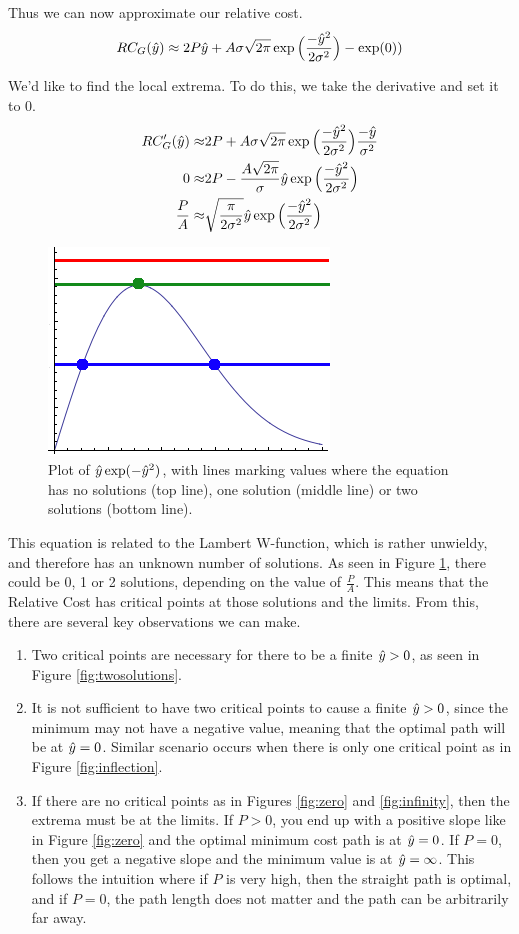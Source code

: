 Thus we can now approximate our relative cost. 
\[
RC_G(\hat{y}) \approx 2P\hat{y} + A\sigma\sqrt{2\pi} \exp\Big(\frac{-\hat{y}^2}{2\sigma^2}\Big) - \exp(0) ) \\
\]

We'd like to find the local extrema. To do this, we take the derivative and set it to 0. 
\begin{align}
RC'_G(\hat{y}) \approx& 2P + A\sigma\sqrt{2\pi}             \exp\Big( \frac{-\hat{y}^2}{2\sigma^2} \Big) \frac{-\hat{y}}{\sigma^2}\notag\\
0  \approx& 2P - \frac{A\sqrt{2\pi}}{\sigma}        \hat{y} \exp\Big( \frac{-\hat{y}^2}{2\sigma^2} \Big) \notag\\
  \frac{P}{A} \approx& \sqrt{\frac{\pi}{2\sigma^2}} \hat{y} \exp\Big( \frac{-\hat{y}^2}{2\sigma^2} \Big) 
\end{align}
\begin{figure}
\centering
\includegraphics[width=0.4\columnwidth]{graphix/lambert.png}
\caption{Plot of $\hat{y} \exp(-\hat{y}^2)$, with lines marking values where the equation has no solutions (top line), one solution (middle line) or two solutions (bottom line).}
\label{fig:lambert}
\end{figure}

This equation is related to the Lambert W-function, which is rather unwieldy, and therefore has an unknown number of solutions. As seen in Figure \ref{fig:lambert}, there could be 0, 1 or 2 solutions, depending on the value of $\frac{P}{A}$. This means that the Relative Cost has critical points at those solutions and the limits. From this, there are several key observations we can make. 
\begin{enumerate}
\item Two critical points are necessary for there to be a finite $\hat{y}>0$, as seen in Figure \ref{fig:twosolutions}. 
\item It is not sufficient to have two critical points to cause a finite $\hat{y}>0$, since the minimum may not have a negative value, meaning that the optimal path will be at $\hat{y}=0$. Similar scenario occurs when there is only one critical point as in Figure \ref{fig:inflection}. 
\item If there are no critical points as in Figures \ref{fig:zero} and \ref{fig:infinity}, then the extrema must be at the limits. If $P>0$, you end up with a positive slope like in Figure \ref{fig:zero} and the optimal minimum cost path is at $\hat{y}=0$. If $P=0$, then you get a negative slope and the minimum value is at $\hat{y}=\infty$. This follows the intuition where if $P$ is very high, then the straight path is optimal, and if $P=0$, the path length does not matter and the path can be arbitrarily far away. 
\end{enumerate}

